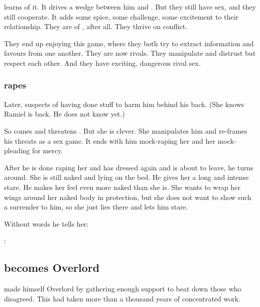 \begin{garbage}
\Dasteron{} learns of it. 
It drives a wedge between him and \Cishiel. 
But they still have sex, and they still cooperate. 
It adds some spice, some challenge, some excitement to their relationship. 
They are \resphain{} of \Mystraacht, after all. 
They thrive on conflict. 

They end up enjoying this game, where they both try to extract information and favours from one another. 
They are now rivals. 
They manipulate and distrust but respect each other. 
And they have exciting, dangerous rival sex. 





\subsubsection{\Dasteron{} rapes \Cishiel}
Later, \Dasteron{} suspects \Cishiel{} of having done stuff to harm him behind his back. 
(She knows Ramiel is back. He does not know yet.) 

So \Dasteron{} comes and threatens \Cishiel. 
But she is clever. 
She manipulates him and re-frames his threats as a sex game. 
It ends with him mock-raping her and her mock-pleading for mercy. 

After he is done raping her and has dressed again and is about to leave, he turns around. 
She is still naked and lying on the bed. 
He gives her a long and intense stare. 
He makes her feel even more naked than she is. 
She wants to wrap her wings around her naked body in protection, but she does not want to show such a surrender to him, so she just lies there and lets him stare. 

Without words he tells her: 
\begin{prose}
  \Dasteron: 
\end{prose}










\subsection{\Dasteron{} becomes Overlord}
\Dasteron{} made himself Overlord by gathering enough support to beat down those who disagreed. 
This had taken more than a thousand years of concentrated work. 


\end{garbage}
